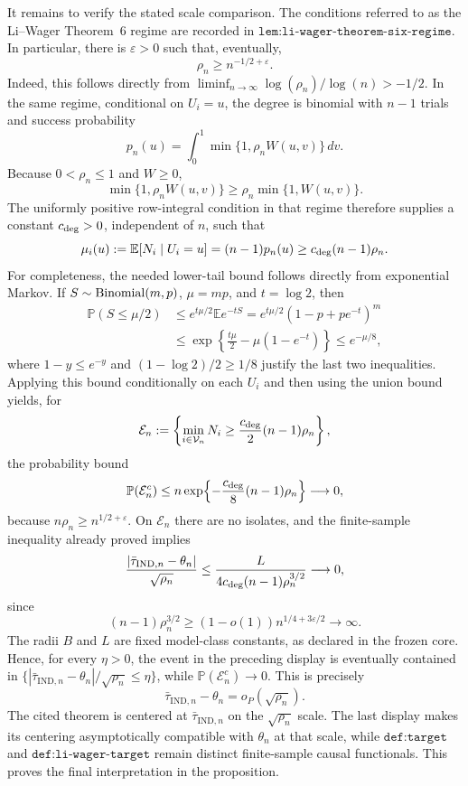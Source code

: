 It remains to verify the stated scale comparison.  The conditions referred to as the Li--Wager Theorem~6 regime are recorded in \(\texttt{lem:li-wager-theorem-six-regime}\).  In particular, there is \(\varepsilon>0\) such that, eventually,
\[
\rho_n\ge n^{-1/2+\varepsilon}.
\]
Indeed, this follows directly from \(\liminf_{n\to\infty}\log(\rho_n)/\log(n)>-1/2\).  In the same regime, conditional on \(U_i=u\), the degree is binomial with \(n-1\) trials and success probability
\[
p_n(u)=\int_0^1\min\{1,\rho_nW(u,v)\}\,dv.
\]
Because \(0<\rho_n\le1\) and \(W\ge0\),
\[
\min\{1,\rho_nW(u,v)\}\ge \rho_n\min\{1,W(u,v)\}.
\]
The uniformly positive row-integral condition in that regime therefore supplies a constant \(c_{\rm deg}>0\), independent of \(n\), such that
\[
\mu_i(u):=\mathbb E[N_i\mid U_i=u]=(n-1)p_n(u)\ge c_{\rm deg}(n-1)\rho_n.
\]
For completeness, the needed lower-tail bound follows directly from exponential Markov.  If \(S\sim{\rm Binomial}(m,p)\), \(\mu=mp\), and \(t=\log 2\), then
\[
\begin{aligned}
\mathbb P(S\le\mu/2)
&\le e^{t\mu/2}\mathbb E e^{-tS}
=e^{t\mu/2}(1-p+pe^{-t})^m\\
&\le \exp\!\left\{\frac{t\mu}{2}-\mu(1-e^{-t})\right\}
\le e^{-\mu/8},
\end{aligned}
\]
where \(1-y\le e^{-y}\) and \((1-\log 2)/2\ge1/8\) justify the last two inequalities.  Applying this bound conditionally on each \(U_i\) and then using the union bound yields, for
\[
\mathcal E_n:=\left\{\min_{i\in\mathcal V_n}N_i\ge \frac{c_{\rm deg}}2(n-1)\rho_n\right\},
\]
the probability bound
\[
\mathbb P(\mathcal E_n^c)
\le n\exp\!\left\{-\frac{c_{\rm deg}}8(n-1)\rho_n\right\}
\longrightarrow0,
\]
because \(n\rho_n\ge n^{1/2+\varepsilon}\).  On \(\mathcal E_n\) there are no isolates, and the finite-sample inequality already proved implies
\[
\frac{|\bar\tau_{\mathrm{IND},n}-\theta_n|}{\sqrt{\rho_n}}
\le \frac{L}{4c_{\rm deg}(n-1)\rho_n^{3/2}}
\longrightarrow0,
\]
since
\[
(n-1)\rho_n^{3/2}\ge (1-o(1))n^{1/4+3\varepsilon/2}\longrightarrow\infty.
\]
The radii \(B\) and \(L\) are fixed model-class constants, as declared in the frozen core.  Hence, for every \(\eta>0\), the event in the preceding display is eventually contained in \(\{|\bar\tau_{\mathrm{IND},n}-\theta_n|/\sqrt{\rho_n}\le\eta\}\), while \(\mathbb P(\mathcal E_n^c)\to0\).  This is precisely
\[
\bar\tau_{\mathrm{IND},n}-\theta_n=o_P(\sqrt{\rho_n}).
\]
The cited theorem is centered at \(\bar\tau_{\mathrm{IND},n}\) on the \(\sqrt{\rho_n}\) scale.  The last display makes its centering asymptotically compatible with \(\theta_n\) at that scale, while \(\texttt{def:target}\) and \(\texttt{def:li-wager-target}\) remain distinct finite-sample causal functionals.  This proves the final interpretation in the proposition.